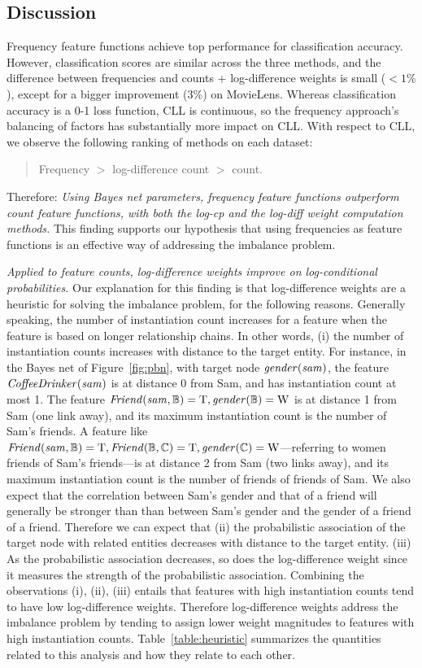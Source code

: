\documentclass[runningheads,a4paper]{llncs}
\newcommand{\keypoint}[1]{{\em #1}}
\begin{document}
\subsection{Discussion} Frequency feature functions achieve top performance for  classification accuracy. However, classification scores are similar across the three methods, and the difference between frequencies and counts + log-difference weights is small ($<1\%$), except for a bigger improvement (3\%) on MovieLens. Whereas classification accuracy is a 0-1 loss function, CLL is continuous, so the frequency approach's balancing of factors has substantially more impact on CLL. With respect to CLL, we observe the following ranking of methods on each dataset: 
\begin{quote}
Frequency $>$ log-difference count $>$ count.
\end{quote} Therefore: \keypoint{Using Bayes net parameters, frequency feature functions outperform count feature functions, with both the log-cp and the log-diff weight computation methods.} This finding supports our hypothesis that using frequencies as feature functions is an effective way of addressing the imbalance problem.

\keypoint{Applied to feature counts, log-difference weights improve on log-conditional probabilities.} Our explanation for this finding is that log-difference weights are a heuristic for solving the imbalance problem, for the following reasons. 
Generally speaking, the number of instantiation count increases for a feature when the feature is based on longer relationship chains. In other words, (i) the number of instantiation counts increases with distance to the target entity.
 For instance, in the Bayes net of Figure~\ref{fig:pbn}, with target node $\it{gender}(sam)$, the feature $\it{CoffeeDrinker}(sam)$ is at distance 0 from Sam, and has instantiation count at most 1. The feature $\it{Friend}(sam,\mathbb{B}) = \mathrm{T},\it{gender}(\mathbb{B}) = \mathrm{W}$ is at distance 1 from Sam (one link away), and its maximum instantiation count is the number of Sam's friends. A feature like $\it{Friend}(sam,\mathbb{B}) = \mathrm{T}, \it{Friend}(\mathbb{B},\mathbb{C}) = \mathrm{T}, \it{gender}(\mathbb{C}) = \mathrm{W}$---referring to women friends of Sam's friends---is at distance 2 from Sam (two links away), and its maximum instantiation count is the number of friends of friends of Sam. We also expect that the correlation between Sam's gender and that of a friend will generally be stronger than than between Sam's gender and the gender of a friend of a friend. Therefore we can expect that (ii) the probabilistic association of the target node with related entities decreases with distance to the target entity. (iii) As the probabilistic association decreases, so does the log-difference weight since it measures the strength of the probabilistic association. Combining the observations (i), (ii), (iii) entails that features with high instantiation counts tend to have low log-difference weights. Therefore log-difference weights address the imbalance problem by tending to assign lower weight magnitudes to features with high instantiation counts. Table~\ref{table:heuristic} summarizes the quantities related to this analysis and how they relate to each other. 
\end{document}

